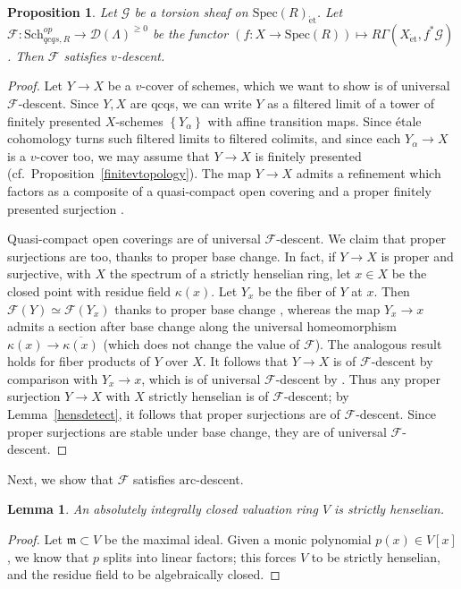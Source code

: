 \documentclass[reqno]{amsart}
\newcommand{\sF}{\mathcal{F}}
\newcommand{\et}{\mathrm{\acute{e}t}}
\newcommand{\arc}{\mathrm{arc}}
\newcommand{\D}{\mathcal{D}}
\newtheorem{proposition}[theorem]{Proposition}
\newtheorem{lemma}[theorem]{Lemma}
\theoremstyle{definition}
\begin{document}
\begin{proposition} 
\label{vDescentEtaleCoh}
Let $\mathcal{G}$ be a torsion sheaf on $\mathrm{Spec}(R)_{\et}$. Let
$\mathcal{F}\colon  \mathrm{Sch}_{qcqs,R}^{op} \to \D( \Lambda)^{\geq 0}$ be the functor $(f\colon X \to \mathrm{Spec}(R)) \mapsto R \Gamma(X_{\et}, f^* \mathcal{G})$. Then $\mathcal{F}$ satisfies $v$-descent. 
\end{proposition} 
\begin{proof} 
Let $Y \to X$ be a $v$-cover of schemes, which we want to show is of universal
$\sF$-descent.
Since $Y, X$ are qcqs, we can write $Y$ as a filtered limit of a tower of
finitely presented
$X$-schemes $\left\{Y_\alpha\right\}$ with affine 
transition maps. Since \'etale cohomology turns such filtered limits to filtered
colimits, and since each $Y_\alpha \to X$ is a $v$-cover too, we may assume that $Y \to X$
is finitely presented (cf.~Proposition~\ref{finitevtopology}). 
The map $Y \to X$ admits a refinement which factors as a composite of a quasi-compact open covering
and a proper finitely presented surjection \cite[Th.~3.12]{Rydh}. 

Quasi-compact open coverings are of universal $\sF$-descent. We claim that proper surjections are too, thanks to proper base change. 
In fact, if $Y \to X$ is proper and surjective, 
with $X$ the spectrum of a strictly henselian ring, let $x \in X$ be the closed
point with residue field $\kappa(x)$. 
Let $Y_x$ be the fiber of $Y$ at $x$. 
Then $\mathcal{F}(Y) \simeq \mathcal{F}( Y_x)$ thanks to proper base change
\cite[Exp.~XII, Th.~5.1]{SGA4}, whereas the map $Y_x \to x$
admits a section after base change along the universal homeomorphism $\kappa(x) \to
\overline{\kappa(x)}$ (which does not change the value of $\mathcal{F}$). 
The analogous result holds for fiber products of $Y$ over $X$. 
It follows that 
$Y \to X$ is of $\mathcal{F}$-descent by comparison with $Y_x \to x$, which is
of universal $\sF$-descent by . 
Thus any proper surjection $Y \to X$ with $X$ strictly henselian is of
$\mathcal{F}$-descent; by Lemma~\ref{hensdetect}, it follows that proper surjections are
of $\mathcal{F}$-descent. 
Since proper surjections are stable under base change, they are of universal
$\mathcal{F}$-descent. 
\end{proof} 


Next, we show that $\mathcal{F}$ satisfies $\arc$-descent. 



\begin{lemma} 
\label{aicstricthens}
An absolutely integrally closed valuation ring $V$ is strictly henselian. 
\end{lemma} 
\begin{proof} 
Let $\mathfrak{m} \subset V$ be the maximal ideal. 
Given a monic polynomial $p(x) \in V[x]$, we know that $p$ splits 
into linear factors; this forces $V$ to be strictly henselian, and 
the residue field to be algebraically closed. 
\end{proof} 
\end{document}
